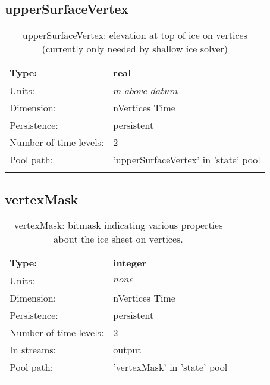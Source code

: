 \subsection[upperSurfaceVertex]{upperSurfaceVertex}
\label{subsec:var_sec_state_upperSurfaceVertex}
\begin{center}
\begin{longtable}{| p{2.0in} | p{4.0in} |}
        \hline 
        Type: & real \\
        \hline 
        Units: & $m$ $above$ $datum$ \\
        \hline 
        Dimension: & nVertices Time \\
        \hline 
        Persistence: & persistent \\
        \hline 
        Number of time levels: & 2 \\
        \hline 
            Pool path: & 'upperSurfaceVertex' in 'state' pool
 \\
		 \hline 
    \caption{upperSurfaceVertex: elevation at top of ice on vertices (currently only needed by shallow ice solver)}
\end{longtable}
\end{center}
\subsection[vertexMask]{vertexMask}
\label{subsec:var_sec_state_vertexMask}
\begin{center}
\begin{longtable}{| p{2.0in} | p{4.0in} |}
        \hline 
        Type: & integer \\
        \hline 
        Units: & $none$ \\
        \hline 
        Dimension: & nVertices Time \\
        \hline 
        Persistence: & persistent \\
        \hline 
        Number of time levels: & 2 \\
        \hline 
		 In streams: &  output \\
        \hline 
            Pool path: & 'vertexMask' in 'state' pool
 \\
		 \hline 
    \caption{vertexMask: bitmask indicating various properties about the ice sheet on vertices.}
\end{longtable}
\end{center}
